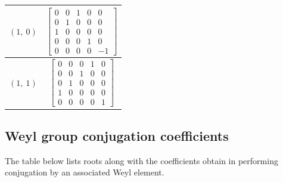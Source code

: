 \documentclass[11pt]{article}
\theoremstyle{definition}
\begin{document}
\begin{longtable}{|l|c|}
    \hline
    $\left( 1, \  0\right)$ & ${\left[\begin{matrix}0 & 0 & 1 & 0 & 0\\0 & 1 & 0 & 0 & 0\\1 & 0 & 0 & 0 & 0\\0 & 0 & 0 & 1 & 0\\0 & 0 & 0 & 0 & -1\end{matrix}\right]}$ \\
    \hline
    $\left( 1, \  1\right)$ & ${\left[\begin{matrix}0 & 0 & 0 & 1 & 0\\0 & 0 & 1 & 0 & 0\\0 & 1 & 0 & 0 & 0\\1 & 0 & 0 & 0 & 0\\0 & 0 & 0 & 0 & 1\end{matrix}\right]}$ \\
    \hline
\end{longtable}


\subsection{Weyl group conjugation coefficients}

The table below lists roots along with the coefficients obtain in performing conjugation by an associated Weyl element.

\bigskip
\end{document}
